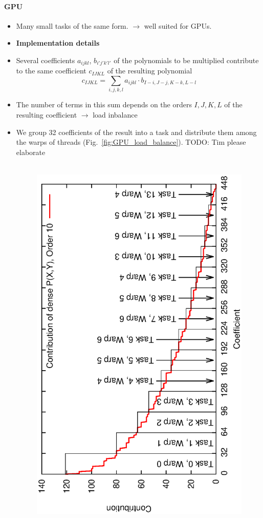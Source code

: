\documentclass[oribibl]{llncs2e/llncs}
\begin{document}
\paragraph{GPU}
\begin{itemize}
\item Many small tasks of the same form. $\rightarrow$ well suited for GPUs.
\item {\bf Implementation details}
\item Several coefficients $a_{ijkl}$, $b_{i'j'k'l'}$ of the polynomials to be multiplied contribute to the same coefficient $c_{IJKL}$ of the resulting polynomial
\begin{equation}
    c_{IJKL} = \sum_{i,j,k,l} a_{ijkl} \cdot b_{I-i,J-j,K-k,L-l}
\end{equation}
\item The number of terms in this sum depends on the orders $I,J,K,L$ of the resulting coefficient $\rightarrow$ load inbalance
\item We group 32 coefficients of the result into a task and distribute them among the warps of threads (Fig.\ \ref{fig:GPU_load_balance}). {\color{red} TODO: Tim please elaborate}
\begin{figure}[t]
    \begin{center}
    \mbox{
        \includegraphics[scale=0.37, angle=-90]{coeffs.eps} 
}
\end{center}
\end{figure}
\end{itemize}
\end{document}
